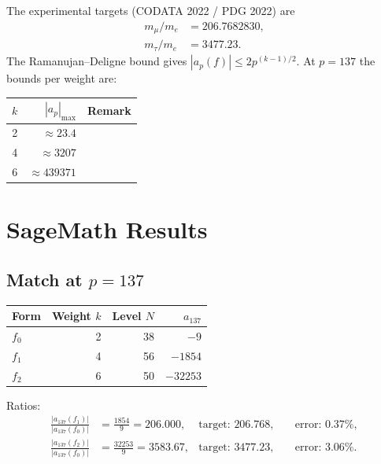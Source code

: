 \documentclass[12pt,a4paper]{article}
\begin{document}
\noindent The experimental targets (CODATA 2022 / PDG 2022) are
\begin{align}
  m_\mu / m_e  &= 206.7682830, \label{eq:mu}\\
  m_\tau / m_e &= 3477.23.     \label{eq:tau}
\end{align}
The Ramanujan--Deligne bound gives $|a_p(f)| \le 2p^{(k-1)/2}$.
At $p = 137$ the bounds per weight are:
\begin{center}
\begin{tabular}{rrl}
\toprule
$k$ & $|a_p|_{\max}$ & Remark \\
\midrule
2 & $\approx 23.4$ & \\
4 & $\approx 3207$ & \\
6 & $\approx 439371$ & \\
\bottomrule
\end{tabular}
\end{center}

\section{SageMath Results}

\subsection{Match at \texorpdfstring{$p=137$}{p=137}}

\begin{center}
\begin{tabular}{lrrr}
\toprule
Form & Weight $k$ & Level $N$ & $a_{137}$ \\
\midrule
$f_0$ & 2 & 38  & $-9$    \\
$f_1$ & 4 & 56  & $-1854$ \\
$f_2$ & 6 & 50  & $-32253$ \\
\bottomrule
\end{tabular}
\end{center}

\noindent Ratios:
\begin{align*}
  \frac{|a_{137}(f_1)|}{|a_{137}(f_0)|}
    &= \frac{1854}{9} = 206.000,
    & \text{target: } 206.768,
    & \quad \text{error: } 0.37\%, \\[4pt]
  \frac{|a_{137}(f_2)|}{|a_{137}(f_0)|}
    &= \frac{32253}{9} = 3583.67,
    & \text{target: } 3477.23,
    & \quad \text{error: } 3.06\%.
\end{align*}
\end{document}
